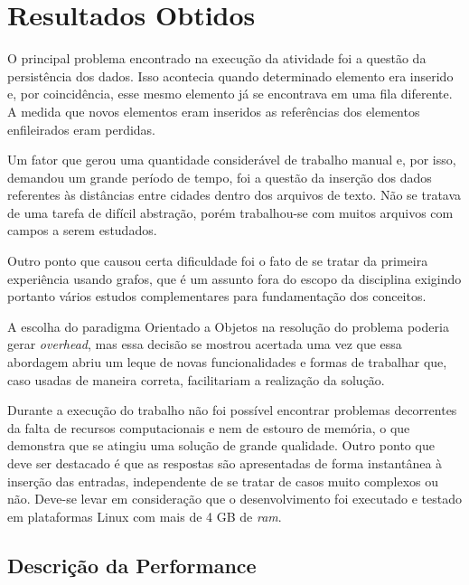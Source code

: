 \chapter[Resultados Obtidos]{Resultados Obtidos}

O principal problema encontrado na execução da atividade foi a questão da persistência dos
dados. Isso acontecia quando determinado elemento era inserido e, por coincidência, esse mesmo
elemento já se encontrava em uma fila diferente. A medida que novos elementos eram inseridos as referências dos elementos enfileirados eram perdidas.

Um fator que gerou uma quantidade considerável de trabalho manual e, por isso, demandou um grande período de tempo, foi a questão da inserção dos dados referentes às distâncias entre cidades dentro dos arquivos de
texto. Não se tratava de uma tarefa de difícil abstração, porém trabalhou-se com muitos arquivos com campos
a serem estudados.

Outro ponto que causou certa dificuldade foi o fato de se tratar da primeira experiência usando grafos,
que é um assunto fora do escopo da disciplina exigindo portanto vários estudos complementares para
fundamentação dos conceitos.

A escolha do paradigma Orientado a Objetos na resolução do problema poderia gerar \textit{overhead}, mas essa decisão se mostrou acertada uma vez que essa abordagem abriu um leque de novas funcionalidades e
formas de trabalhar que, caso usadas de maneira correta, facilitariam a realização da solução.

Durante a execução do trabalho não foi possível encontrar problemas decorrentes da falta de recursos
computacionais e nem de estouro de memória, o que demonstra que se atingiu uma solução de
grande qualidade. Outro ponto que deve ser destacado é que as respostas são apresentadas de forma instantânea à inserção das entradas, independente de se tratar de casos muito complexos ou não. Deve-se levar em consideração que o desenvolvimento foi executado e testado em plataformas Linux com mais de 4 GB de \textit{ram}.

\section{Descrição da Performance}

